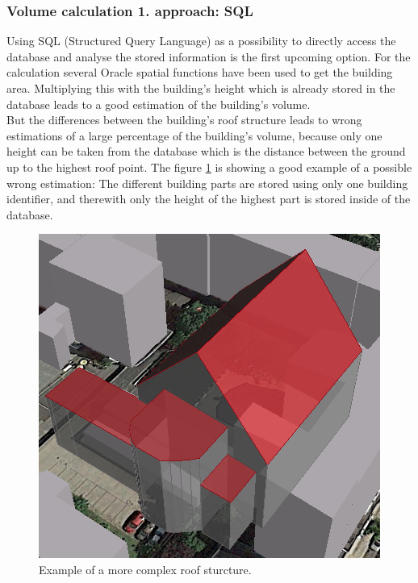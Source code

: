 \subsubsection{Volume calculation 1. approach: SQL}
Using SQL (Structured Query Language) as a possibility to directly access the database and analyse the stored information is the first upcoming option. For the calculation several Oracle spatial functions have been used to get the building area. Multiplying this with the building's height which is already stored in the database leads to a good estimation of the building's volume.\\
But the differences between the building's roof structure leads to wrong estimations of a large percentage of the building's volume, because only one height can be taken from the database which is the distance between the ground up to the highest roof point. The figure \ref{fig:build_h} is showing a good example of a possible wrong estimation: The different building parts are stored using only one building identifier, and therewith only the height of the highest part is stored inside of the database.
\begin{figure}[h]
	\centering
 	 \includegraphics[scale=0.3]{phase1/group1/build_h.png} 
	\caption{Example of a more complex roof sturcture.}
	\label{fig:build_h}
\end{figure}


